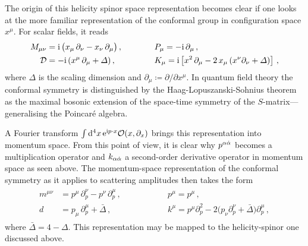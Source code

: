 The origin of this helicity spinor space representation becomes clear if one looks at the
more familiar representation of the conformal group in configuration space $x^\mu$. 
 For scalar fields, it reads
%
\begin{align}
\begin{alignedat}{2}
M_{\mu\nu} & = \i \, \bigl(x_\mu\, \partial_\nu -x_\nu\, \partial_\mu\bigr) \,, \qquad \qquad 
&& P_\mu = - \i \, \partial_\mu \,, \\
\mathcal{D} & =- \i \, (x^\mu\, \partial_\mu  + \Delta)\,,
&& K_\mu = \i \left[ x^2\, \partial_\mu - 2 \, x_\mu \, (x^\nu \partial_\nu 
+\Delta) \right] \,, 
\end{alignedat}
\label{confalgebra-config}
\end{align}
%
where $\Delta$ is the scaling dimension and $\partial_\mu \coloneqq
\partial/\partial x^\mu$.
In quantum field theory the conformal symmetry is distinguished by the 
Haag-Lopuszanski-Sohnius theorem~\cite{ch2_Haag:1974qh} as the maximal bosonic 
extension of the space-time symmetry of the $S$-matrix---generalising the
Poincar\'e algebra.


A Fourier transform $\int \mathrm{d}^4x \, \mathrm{e}^{\mathrm{i} p\cdot x} \mathcal{O}(x,\partial_x)$ brings this 
representation into momentum space. From this
point of view, it is clear why $p^{\alpha{\dot{\alpha}}}$ becomes a multiplication operator and
$k_{\alpha{\dot{\alpha}}}$ a second-order derivative operator in momentum space as seen above.
The momentum-space representation of the conformal symmetry as it applies to
scattering amplitudes then takes the form
%
\begin{align}
\begin{alignedat}{2}
m^{\mu\nu} & = p^\mu\, \partial^\nu_{p} -p^{\nu}\, \partial^{\mu}_{p} \,, \qquad \qquad 
&& p^{\mu} = p^{\mu} \,, \\
d & = p_\mu\, \partial^{\mu}_{p}  + \bar\Delta\,,
&& k^{\mu} = p^{\mu} \partial_{p}^{2}- 2\bigl(p_{\nu}\partial^{\nu}_{p}+\bar{\Delta} \bigr)\partial^{\mu}_{p} \,,
\end{alignedat}
\end{align}
where $\bar{\Delta}=4-\Delta$.
%
This representation may be mapped to the helicity-spinor one discussed above.

